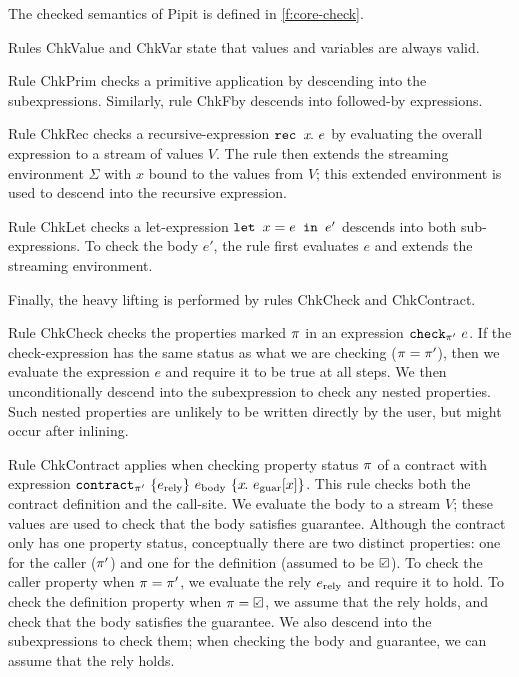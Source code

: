 \documentclass[a4paper,UKenglish,cleveref, autoref, thm-restate,anonymous]{lipics-v2021}
\begin{document}
The checked semantics of Pipit is defined in \autoref{f:core-check}.


Rules {\sc ChkValue} and {\sc ChkVar} state that values and variables are always valid.

Rule {\sc ChkPrim} checks a primitive application by descending into the subexpressions.
Similarly, rule {\sc ChkFby} descends into followed-by expressions.

Rule {\sc ChkRec} checks a recursive-expression $\texttt{rec~} x\hspace{-0.1em}.~e$ by evaluating the overall expression to a stream of values $V$.
The rule then extends the streaming environment $\Sigma$ with $x$ bound to the values from $V$; this extended environment is used to descend into the recursive expression.

Rule {\sc ChkLet} checks a let-expression $\texttt{let~} x = e \texttt{~in~} e'$ descends into both sub-expressions.
To check the body $e'$, the rule first evaluates $e$ and extends the streaming environment.

Finally, the heavy lifting is performed by rules {\sc ChkCheck} and {\sc ChkContract}.

Rule {\sc ChkCheck} checks the properties marked $\pi$ in an expression $\texttt{check}_{\pi'}~e$.
If the check-expression has the same status as what we are checking ($\pi = \pi'$), then we evaluate the expression $e$ and require it to be true at all steps.
We then unconditionally descend into the subexpression to check any nested properties.
Such nested properties are unlikely to be written directly by the user, but might occur after inlining.

Rule {\sc ChkContract} applies when checking property status $\pi$ of a contract with expression $\texttt{contract}_{\pi'}~\{e_{\text{rely}}\}~e_{\text{body}}~\{x\hspace{-0.1em}.~e_{\text{guar}}[x]\}$.
This rule checks both the contract definition and the call-site.
We evaluate the body to a stream $V$; these values are used to check that the body satisfies guarantee.
Although the contract only has one property status, conceptually there are two distinct properties: one for the caller ($\pi'$) and one for the definition (assumed to be $\PSValid$).
To check the caller property when $\pi = \pi'$, we evaluate the rely $e_{\text{rely}}$ and require it to hold.
To check the definition property when $\PStatus = \PSValid$, we assume that the rely holds, and check that the body satisfies the guarantee.
We also descend into the subexpressions to check them; when checking the body and guarantee, we can assume that the rely holds.
\end{document}
